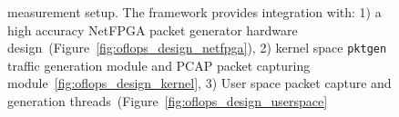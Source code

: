 \begin{figure}
\centering
{}
\label{fig:oflops_design}
\caption{\oflops measurement setup. The framework provides integration with: 1) a
  high accuracy NetFPGA packet generator hardware
  design~(Figure~\ref{fig:oflops_design_netfpga}), 2) kernel space {\tt pktgen}
  traffic generation module and PCAP packet capturing
  module~\ref{fig:oflops_design_kernel},
  3) User space packet capture and generation
  threads~(Figure~\ref{fig:oflops_design_userspace}} 
\end{figure}

